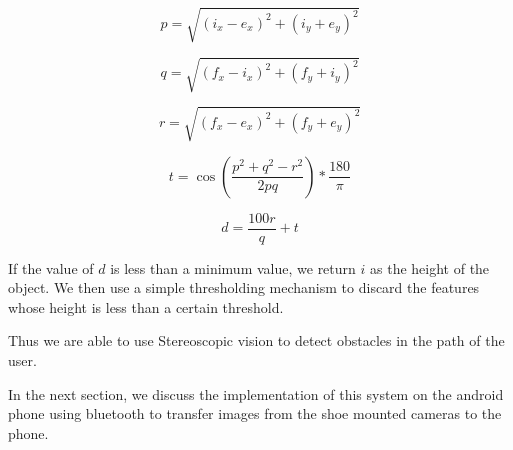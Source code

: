 \documentclass[11pt]{report}
\begin{document}
\begin{equation}
p = \sqrt{(i_x - e_x)^2 + (i_y + e_y)^2}
\end{equation} 

\begin{equation}
q = \sqrt{(f_x - i_x)^2 + (f_y + i_y)^2}
\end{equation} 

\begin{equation}
r = \sqrt{(f_x - e_x)^2 + (f_y + e_y)^2}
\end{equation} 

\begin{equation}
t = \cos(\frac{p^2+q^2-r^2}{2pq}) *\frac{180}{\pi}
\end{equation} 

\begin{equation}
d= \frac{100r}{q} + t
\end{equation}

If the value of $d$ is less than a minimum value, we return $i$ as the height of the object. We then use a simple thresholding mechanism to discard the features whose height is less than a certain threshold.

Thus we are able to use Stereoscopic vision to detect obstacles in the path of the user.

In the next section, we discuss the implementation of this system on the android phone using bluetooth to transfer images from the shoe mounted cameras to the phone. 



\end{document}
